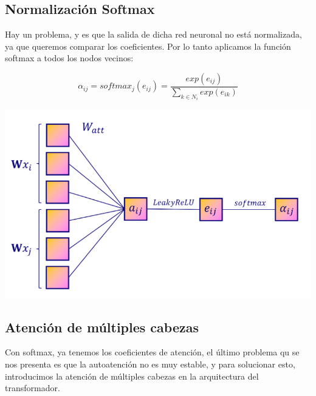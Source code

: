 \documentclass{article}
\begin{document}
\vspace{1cm}

\subsection{Normalización Softmax}

\vspace{1cm}

Hay un problema, y es que la salida de dicha red neuronal no está normalizada, ya que queremos comparar los coeficientes. Por lo tanto aplicamos la función softmax a todos los nodos vecinos:

\vspace{0.5cm}

\begin{equation}
    \alpha_{ij} = softmax_{j}(e_{ij}) = \frac{exp(e_{ij})}{\sum_{k \in N_{i}}exp(e_{ik})}
\end{equation}

\vspace{0.5cm}

\begin{center}
    \includegraphics[width=0.75\linewidth]{softmax.png}
\end{center}

\vspace{1cm}

\subsection{Atención de múltiples cabezas}

\vspace{1cm}

Con softmax, ya tenemos los coeficientes de atención, el último problema qu se nos presenta es que la autoatención no es muy estable, y para solucionar esto, introducimos la atención de múltiples cabezas en la arquitectura del transformador.
\end{document}
